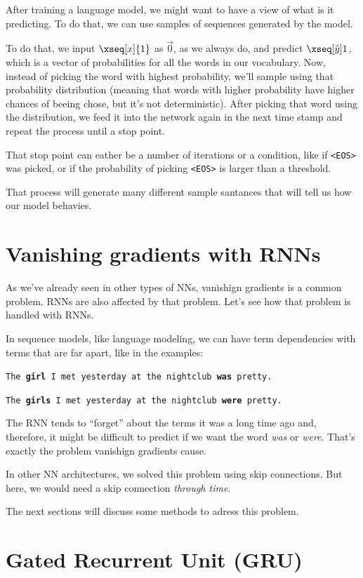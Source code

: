 \documentclass[12pt, a4paper, oneside]{book}
\begin{document}
After training a language model, we might want to have a view of what is it
predicting. To do that, we can use samples of sequences generated by the model.

To do that, we input $\xseq[x]{1}$ as $\vec{0}$, as we always do, and predict
$\xseq[\hat{y}]{1}$, which is a vector of probabilities for all the words in our
vocabulary. Now, instead of picking the word with highest probability, we'll
sample using that probability distribution (meaning that words with higher
probability have higher chances of beeing chose, but it's not deterministic).
After picking that word using the distribution, we feed it into the network
again in the next time stamp and repeat the process until a stop point.

That stop point can eather be a number of iterations or a condition, like if
\texttt{<EOS>} was picked, or if the probability of picking \texttt{<EOS>} is
larger than a threshold.

That process will generate many different sample santances that will tell us how
our model behavies.

\section{Vanishing gradients with RNNs}%
\label{sec:vanishing_gradients_with_rnns}

As we've already seen in other types of NNs, vanishign gradients is a common
problem. RNNs are also affected by that problem. Let's see how that problem is
handled with RNNs.

In sequence models, like language modeling, we can have term dependencies with
terms that are far apart, like in the examples: \jump

\texttt{The \textbf{girl} I met yesterday at the nightclub \textbf{was} pretty.}

\texttt{The \textbf{girls} I met yesterday at the nightclub \textbf{were} pretty.}
\jump

The RNN tends to ``forget'' about the terms it was a long time ago and,
therefore, it might be difficult to predict if we want the word \textit{was} or
\textit{were}. That's exactly the problem vanishign gradients cause.

In other NN architectures, we solved this problem using skip connections. But
here, we would need a skip connection \textit{through time}. \jump

The next sections will discuss some methods to adress this problem.

\section{Gated Recurrent Unit (GRU)}%
\label{sec:gated_recurrent_unit_gru_}






\end{document}
